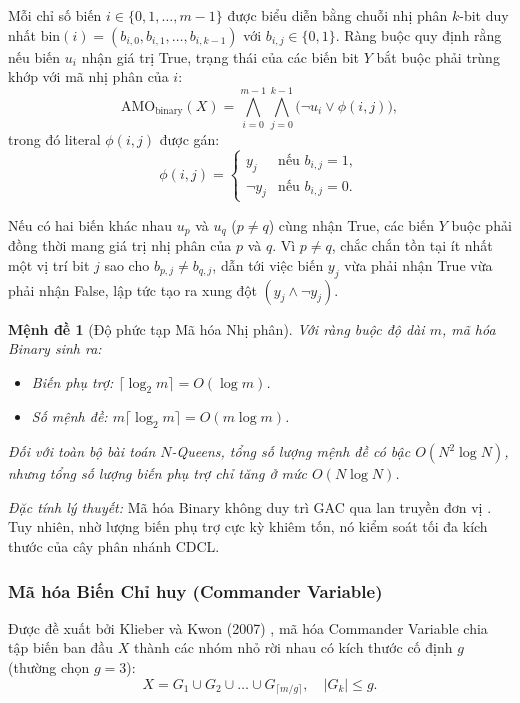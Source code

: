 \documentclass[a4paper,fleqn]{cas-sc}
\newtheorem{proposition}{Mệnh đề}
\begin{document}
Mỗi chỉ số biến $i \in \{0, 1, \dots, m-1\}$ được biểu diễn bằng chuỗi nhị phân $k$-bit duy nhất $\text{bin}(i) = (b_{i,0}, b_{i,1}, \dots, b_{i,k-1})$ với $b_{i,j} \in \{0, 1\}$. Ràng buộc quy định rằng nếu biến $u_i$ nhận giá trị True, trạng thái của các biến bit $Y$ bắt buộc phải trùng khớp với mã nhị phân của $i$:
\begin{equation}
    \text{AMO}_{\text{binary}}(X) = \bigwedge_{i=0}^{m-1} \bigwedge_{j=0}^{k-1} \Big(\neg u_i \lor \phi(i, j)\Big),
\end{equation}
trong đó literal $\phi(i, j)$ được gán:
\begin{equation}
    \phi(i, j) = \begin{cases}
        y_j & \text{nếu } b_{i,j} = 1, \\
        \neg y_j & \text{nếu } b_{i,j} = 0.
    \end{cases}
\end{equation}

Nếu có hai biến khác nhau $u_p$ và $u_q$ ($p \neq q$) cùng nhận True, các biến $Y$ buộc phải đồng thời mang giá trị nhị phân của $p$ và $q$. Vì $p \neq q$, chắc chắn tồn tại ít nhất một vị trí bit $j$ sao cho $b_{p,j} \neq b_{q,j}$, dẫn tới việc biến $y_j$ vừa phải nhận True vừa phải nhận False, lập tức tạo ra xung đột $(y_j \land \neg y_j)$.

\begin{proposition}[Độ phức tạp Mã hóa Nhị phân]
Với ràng buộc độ dài $m$, mã hóa Binary sinh ra:
\begin{itemize}
    \item Biến phụ trợ: $\lceil \log_2 m \rceil = O(\log m)$.
    \item Số mệnh đề: $m \lceil \log_2 m \rceil = O(m \log m)$.
\end{itemize}
Đối với toàn bộ bài toán $N$-Queens, tổng số lượng mệnh đề có bậc $O(N^2 \log N)$, nhưng tổng số lượng biến phụ trợ chỉ tăng ở mức $O(N \log N)$.
\end{proposition}

\textit{Đặc tính lý thuyết:} Mã hóa Binary không duy trì GAC qua lan truyền đơn vị \cite{frisch2005atmost}. Tuy nhiên, nhờ lượng biến phụ trợ cực kỳ khiêm tốn, nó kiểm soát tối đa kích thước của cây phân nhánh CDCL.

\subsubsection{Mã hóa Biến Chỉ huy (Commander Variable)}
Được đề xuất bởi Klieber và Kwon (2007) \cite{klieber2007commander}, mã hóa Commander Variable chia tập biến ban đầu $X$ thành các nhóm nhỏ rời nhau có kích thước cố định $g$ (thường chọn $g=3$):
\begin{equation}
    X = G_1 \cup G_2 \cup \dots \cup G_{\lceil m/g \rceil}, \quad |G_k| \le g.
\end{equation}
\end{document}
